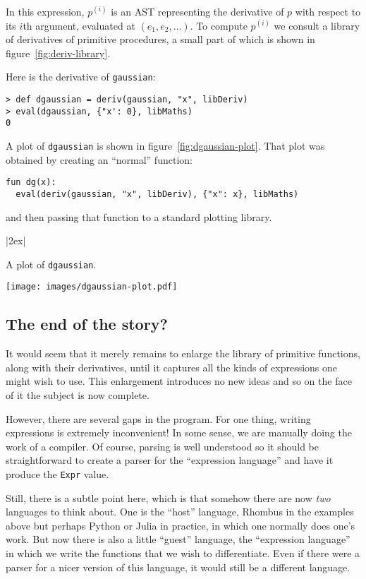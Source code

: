 \documentclass[11pt, a4paper]{article}
\newcommand{\cd}[1]{\texttt{#1}}
\begin{document}
In this expression, $p^{(i)}$ is an AST representing the derivative of
$p$ with respect to its $i$th argument, evaluated at
$(e_1, e_2, \dotsc)$. To compute $p^{(i)}$ we consult a library of
derivatives of primitive procedures, a small part of which is shown in
figure~\ref{fig:deriv-library}.

Here is the derivative of \cd{gaussian}:
\begin{verbatim}
> def dgaussian = deriv(gaussian, "x", libDeriv)
> eval(dgaussian, {"x': 0}, libMaths)
0
\end{verbatim}
A plot of \cd{dgaussian} is shown in figure~\ref{fig:dgaussian-plot}.
That plot was obtained by creating an ``normal'' function:
\begin{verbatim}
fun dg(x):
  eval(deriv(gaussian, "x", libDeriv), {"x": x}, libMaths)
\end{verbatim}
and then passing that function to a standard plotting library.
\begin{marginfigure}|2ex|
  \caption{A plot of \cd{dgaussian}.\label{fig:dgaussian-plot}}
  \centering
  \texttt{[image: images/dgaussian-plot.pdf]}
\end{marginfigure}
  
\subsection{The end of the story?}

It would seem that it merely remains to enlarge the library of
primitive functions, along with their derivatives, until it captures
all the kinds of expressions one might wish to use. This enlargement
introduces no new ideas and so on the face of it the subject is now
complete.

However, there are several gaps in the program. For one thing, writing
expressions is extremely inconvenient! In some sense, we are manually
doing the work of a compiler. Of course, parsing is well understood so
it should be straightforward to create a parser for the ``expression
language'' and have it produce the \cd{Expr} value.

Still, there is a subtle point here, which is that somehow there are
now \emph{two} languages to think about. One is the ``host'' language,
Rhombus in the examples above but perhaps Python or Julia in practice,
in which one normally does one's work. But now there is also a little
``guest'' language, the ``expression language'' in which we write the
functions that we wish to differentiate. Even if there were a parser
for a nicer version of this language, it would still be a different
language.
\end{document}
